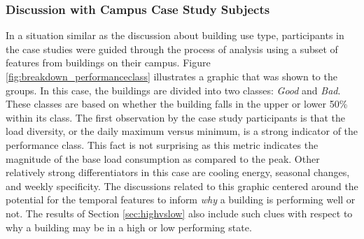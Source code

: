 \subsubsection{Discussion with Campus Case Study Subjects}
\label{sec:performanceclass_oncasestudy}

In a situation similar as the discussion about building use type, participants in the case studies were guided through the process of analysis using a subset of features from buildings on their campus. Figure \ref{fig:breakdown_performanceclass} illustrates a graphic that was shown to the groups. In this case, the buildings are divided into two classes: \emph{Good} and \emph{Bad}. These classes are based on whether the building falls in the upper or lower 50\% within its class. The first observation by the case study participants is that the load diversity, or the daily maximum versus minimum, is a strong indicator of the performance class. This fact is not surprising as this metric indicates the magnitude of the base load consumption as compared to the peak. Other relatively strong differentiators in this case are cooling energy, seasonal changes, and weekly specificity. The discussions related to this graphic centered around the potential for the temporal features to inform \emph{why} a building is performing well or not. The results of Section \ref{sec:highvslow} also include such clues with respect to why a building may be in a high or low performing state. 